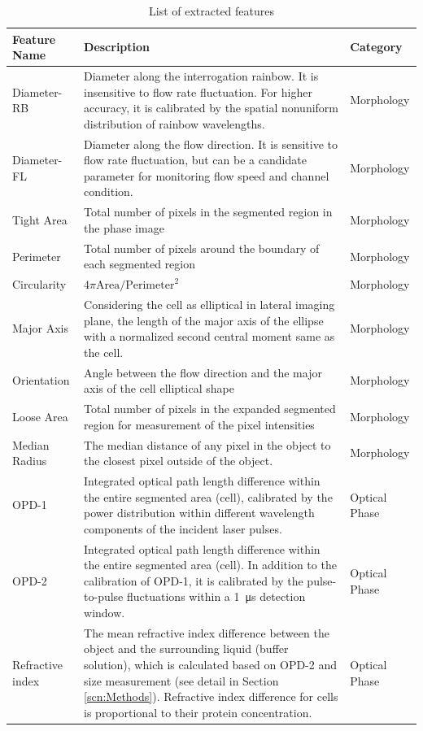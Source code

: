 \documentclass[aps,pra,reprint,superscriptaddress]{revtex4-1}
\begin{document}
\begin{table}
\caption{\label{tbl:Features} List of extracted features}
\begin{tabular}{|p{}|p{}|p{}|}
\hline
Feature Name	 &Description	 &Category\\ \hline
Diameter-RB	 &Diameter along the interrogation rainbow. It is insensitive to flow rate fluctuation. For higher accuracy, it is calibrated by the spatial nonuniform distribution of rainbow wavelengths. 	 &Morphology\\ \hline
Diameter-FL	 &Diameter along the flow direction. It is sensitive to flow rate fluctuation, but can be a candidate parameter for monitoring flow speed and channel condition.	 &Morphology\\ \hline
Tight Area	 &Total number of pixels in the segmented region in the phase image	 &Morphology\\ \hline
Perimeter	 &Total number of pixels around the boundary of each segmented region	 &Morphology\\ \hline
Circularity	 &$4\pi \text{Area} / \text{Perimeter}^2$  &Morphology\\ \hline
Major Axis 	 &Considering the cell as elliptical in lateral imaging plane, the length of the major axis of the ellipse with a normalized second central moment same as the cell.	 &Morphology\\ \hline
Orientation	 &Angle between the flow direction and the major axis of the cell elliptical shape	 &Morphology\\ \hline
Loose Area	 &Total number of pixels in the expanded segmented region for measurement of the pixel intensities	 &Morphology\\ \hline
Median Radius	 &The median distance of any pixel in the object to the closest pixel outside of the object.	 &Morphology\\ \hline
OPD-1	 &Integrated optical path length difference within the entire segmented area (cell), calibrated by the power distribution within different wavelength components of the incident laser pulses.	 &Optical Phase\\ \hline
OPD-2	 &Integrated optical path length difference within the entire segmented area (cell). In addition to the calibration of OPD-1, it is calibrated by the pulse-to-pulse fluctuations within a \SI{1}{\micro\second} detection window.	 &Optical Phase\\ \hline
Refractive index	 &The mean refractive index difference between the object and the surrounding liquid (buffer solution), which is calculated based on OPD-2 and size measurement (see detail in Section \ref{scn:Methods}). Refractive index difference for cells is proportional to their protein concentration.	 &Optical Phase\\ \hline

\end{tabular}
\end{table}
\end{document}
